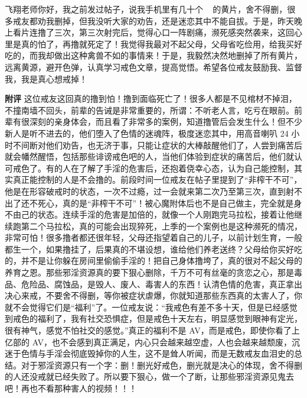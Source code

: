 \begin{case}
    飞翔老师你好，我之前发过帖子，说我手机里有几十个 \unit{\giga\byte} 的黄片，舍不得删，很多戒友都劝我删掉，但我没听大家的劝告，还是迷恋其中不能自拔。于是，昨天晚上看片连撸了三次，第三次射完后，觉得心口一阵剧痛，濒死感突然袭来，这回心里是真的怕了，再撸就死定了！我觉得我最对不起父母，父母省吃俭用，给我买好吃的，而我却做出这种禽兽不如的事情来！于是，我毅然决然地删掉了所有黄片，远离黄源，避开色弹，认真学习戒色文章，提高觉悟。希望各位戒友鼓励我、监督我，我是真心想戒掉！

    \textbf{附评} 这位戒友这回真的撸到怕！撸到面临死亡了！很多人都是不见棺材不掉泪，不撞南墙不回头，前辈的告诫是非常重要的，所谓：不听老人言，吃亏在眼前。前辈有很深刻的亲身体会，而且看了非常多的案例，知道撸管后会发生什么！但不少新人是听不进去的，他们堕入了色情的迷魂阵，极度迷恋其中，用高音喇叭 24 小时不间断对他们劝告，也无济于事，只能让症状的大棒敲醒他们了，人尝到痛苦后就会幡然醒悟，包括那些诽谤戒色吧的人，当他们体验到症状的痛苦后，他们就认可戒色了。有的人在了解了手淫的危害后，还抱着侥幸心态，认为自己能控制，其实真正能控制的人是不会撸的。前段时间一位戒友在帖子里提到了“非榨干不可”，他是在形容破戒时的状态，一次不过瘾，过一会就来第二次乃至第三次，直到射不出了还不死心，真的是“非榨干不可”！被心魔附体后也不是自己做主，完全就是身不由己的状态。连续手淫的危害是加倍的，就像一个人刚跑完马拉松，接着让他继续跑第二个马拉松，真的可能会出现猝死，上季的一个案例也是这种濒死的情况，非常可怕！很多撸者都还很年轻，父母还指望着自己的儿子，以前计划生育，一般都生一个，如果撸挂了，后果真的不堪设想，谁给他们养老送终？父母给你买好吃的，并不是让你躲在房间里偷偷手淫的！把自己身体撸垮了，真的很对不起父母的养育之恩。那些邪淫资源真的要下狠心删除，千万不可有丝毫的贪恋之心，那是毒品、危险品、腐蚀品，是毁人、废人、毒害人的东西！认清色情的危害，真正拿出决心来戒，不要舍不得删，等你被症状虐爆，你就知道那些东西真的太害人了，你就不会觉得它们是“福利”了。一位戒友说：“我戒色有差不多十天，但是已经感觉到戒色的福利了，我有社交恐惧症，但是戒色十天左右，明显感觉到眼神有定光，很有神气，感觉不怕社交的感觉。”真正的福利不是 AV，而是戒色，即使你看了上亿部的 AV，也不会感到真正满足，内心只会越来越空虚，人也会越来越颓废，沉迷于色情与手淫会彻底毁掉你的人生，这不是耸人听闻，而是无数戒友血泪史的总结。对于邪淫资源只有一个字：删！删光好戒色，删光就是决心的体现，舍不得删的人还没戒就已经失败了。所以要下狠心，做一个了断，让那些邪淫资源见鬼去吧！再也不看那种害人的视频！！！
\end{case}

